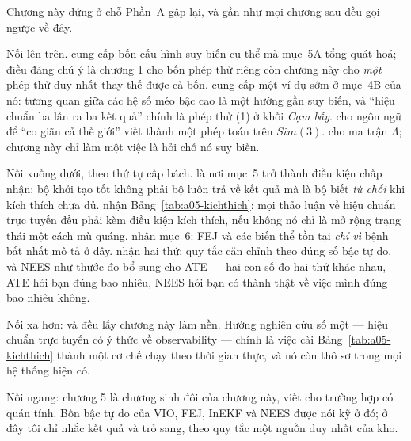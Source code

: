 \documentclass[../../vslam.tex]{subfiles}
\begin{document}
Chương này đứng ở chỗ Phần~A gập lại, và gần như mọi chương sau đều gọi ngược về đây.

Nối lên trên.  cung cấp bốn cấu hình suy biến cụ thể mà mục~5A tổng quát hoá; điều đáng chú ý là chương 1 cho bốn phép thử riêng còn chương này cho \emph{một} phép thử duy nhất thay thế được cả bốn.  cung cấp một ví dụ sớm ở mục~4B của nó: tương quan giữa các hệ số méo bậc cao là một hướng gần suy biến, và ``hiệu chuẩn ba lần ra ba kết quả'' chính là phép thử (1) ở khối \emph{Cạm bẫy}.  cho ngôn ngữ để ``co giãn cả thế giới'' viết thành một phép toán trên \(Sim(3)\).  cho ma trận \(\Lambda\); chương này chỉ làm một việc là hỏi chỗ nó suy biến.

Nối xuống dưới, theo thứ tự cấp bách.  là nơi mục~5 trở thành điều kiện chấp nhận: bộ khởi tạo tốt không phải bộ luôn trả về kết quả mà là bộ biết \emph{từ chối} khi kích thích chưa đủ.  nhận Bảng~\ref{tab:a05-kichthich}: mọi thảo luận về hiệu chuẩn trực tuyến đều phải kèm điều kiện kích thích, nếu không nó chỉ là mở rộng trạng thái một cách mù quáng.  nhận mục~6: FEJ và các biến thể tồn tại \emph{chỉ vì} bệnh bất nhất mô tả ở đây.  nhận hai thứ: quy tắc căn chỉnh theo đúng số bậc tự do, và NEES như thước đo bổ sung cho ATE --- hai con số đo hai thứ khác nhau, ATE hỏi bạn đúng bao nhiêu, NEES hỏi bạn có thành thật về việc mình đúng bao nhiêu không.

Nối xa hơn:  và  đều lấy chương này làm nền. Hướng nghiên cứu số một --- hiệu chuẩn trực tuyến có ý thức về observability --- chính là việc cài Bảng~\ref{tab:a05-kichthich} thành một cơ chế chạy theo thời gian thực, và nó còn thô sơ trong mọi hệ thống hiện có.

Nối ngang:  chương 5 là chương sinh đôi của chương này, viết cho trường hợp có quán tính. Bốn bậc tự do của VIO, FEJ, InEKF và NEES được nói kỹ ở đó; ở đây tôi chỉ nhắc kết quả và trỏ sang, theo quy tắc một nguồn duy nhất của kho.
\end{document}
